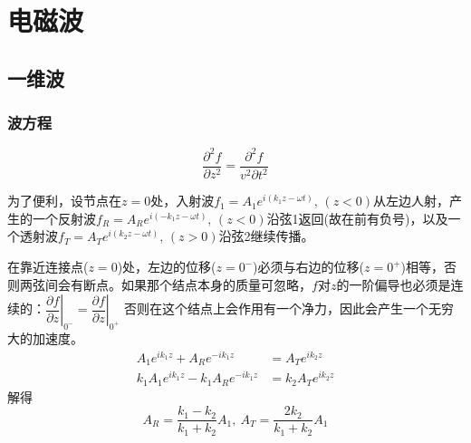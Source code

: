 \cleardoublepage
\section{电磁波}
\subsection{一维波}
\subsubsection{波方程}
\begin{equation}
    \frac{\partial^2 f}{\partial z^2}=\frac{\partial^2 f}{v^2\partial t^2}
\end{equation}

为了便利，设节点在$z=0$处，入射波$f_1=A_1e^{i(k_1z-\omega t)},\, (z<0)$从左边人射，产生的一个反射波$f_R=A_Re^{i(-k_1z-\omega t)},\, (z<0)$沿弦1返回(故在前有负号)，以及一个透射波$f_T=A_Te^{i(k_2z-\omega t)},\, (z>0)$沿弦2继续传播。

在靠近连接点($z=0$)处，左边的位移($z=0^-$)必须与右边的位移($z=0^+$)相等，否则两弦间会有断点。如果那个结点本身的质量可忽略，$f$对$z$的一阶偏导也必须是连续的：$\left.\dfrac{\partial f}{\partial z}\right|_{0^-}=\left.\dfrac{\partial f}{\partial z}\right|_{0^+}$
否则在这个结点上会作用有一个净力，因此会产生一个无穷大的加速度。
\begin{align*}
    A_1e^{ik_1z}+A_Re^{-ik_1z}&=A_Te^{ik_2z}\\
    k_1A_1e^{ik_1z}-k_1A_Re^{-ik_1z}&=k_2A_Te^{ik_2z}
\end{align*}
解得
\begin{equation}
    A_R=\frac{k_1-k_2}{k_1+k_2}A_1, \ A_T=\frac{2k_2}{k_1+k_2}A_1
\end{equation}

